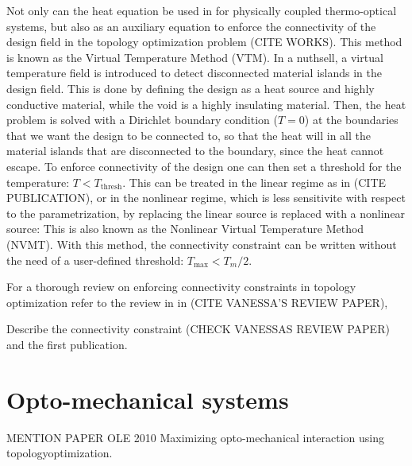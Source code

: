 Not only can the heat equation be used in for physically coupled thermo-optical systems,
but also as an auxiliary equation to enforce the connectivity of the design field in the 
topology optimization problem (CITE WORKS). This method is known as the Virtual Temperature
Method (VTM). In a nuthsell, a virtual temperature field is introduced to detect 
disconnected material islands in the design field. This is done by defining the design as a 
heat source and highly conductive material, while the void is a highly insulating material.
Then, the heat problem is solved with a Dirichlet boundary condition ($T = 0$) at the boundaries
that we want the design to be connected to, so that the heat will in all the
material islands that are disconnected to the boundary, since the heat cannot escape. To enforce
connectivity of the design one can then set a threshold for the temperature: $T < T_\text{thresh}$.
This can be treated in the linear regime as in (CITE PUBLICATION), or in the nonlinear regime, which
is less sensitivite with respect to the parametrization, by replacing the linear source is replaced 
with a nonlinear source:
This is also known as the Nonlinear Virtual Temperature Method (NVMT). With this method, 
the connectivity constraint can be written without the need of a user-defined threshold:
$T_\text{max} < T_m/2$.

For a thorough review on enforcing connectivity constraints in topology optimization
refer to the review in in (CITE VANESSA'S REVIEW PAPER),


Describe the connectivity constraint (CHECK VANESSAS REVIEW PAPER) and the first publication.

\section{Opto-mechanical systems~\cite{ownpub1,ownpub2,ownpub3}}

MENTION PAPER OLE 2010 Maximizing opto-mechanical interaction using topologyoptimization.


